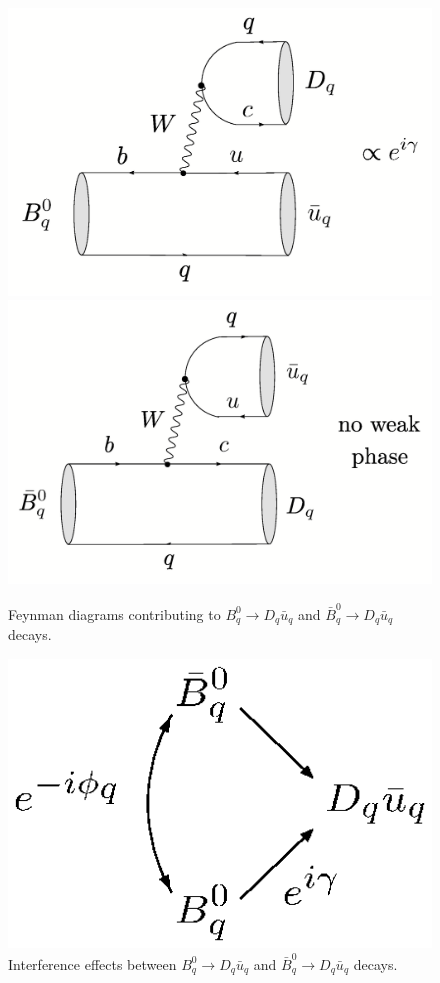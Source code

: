 \documentclass[11pt]{cernrep}
\begin{document}
 
\begin{figure}[t]
\centerline{
 \includegraphics[width=5.2truecm]{B0qtoubarqDq-1.ps}
 \hspace*{0.5truecm}
 \includegraphics[width=5.2truecm]{B0qbartoDquqbar-1.ps}  
 }
 \vspace*{-0.3truecm}
\caption{Feynman diagrams contributing to $B^0_q\to D_q\bar u_q$
and $\bar B^0_q\to D_q \bar u_q$ 
decays.}\label{fig:BqDquq}
\end{figure}


\begin{figure}
\centerline{
 \includegraphics[width=3.0truecm]{B0qbar-B0q-Dquqbar-int-1.ps} }
 \vspace*{-0.3truecm}
\caption{Interference effects between $B^0_q\to D_q\bar u_q$
and $\bar B^0_q\to D_q\bar u_q$ 
decays.}\label{fig:BqDquq-int}
\end{figure}
\end{document}

